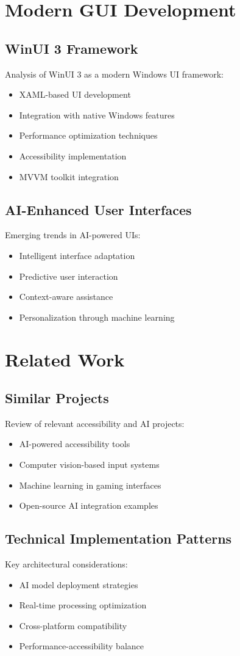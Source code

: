 \section{Modern GUI Development}
\subsection{WinUI 3 Framework}
Analysis of WinUI 3 as a modern Windows UI framework:
\begin{itemize}
    \item XAML-based UI development
    \item Integration with native Windows features
    \item Performance optimization techniques
    \item Accessibility implementation
    \item MVVM toolkit integration
\end{itemize}

\subsection{AI-Enhanced User Interfaces}
Emerging trends in AI-powered UIs:
\begin{itemize}
    \item Intelligent interface adaptation
    \item Predictive user interaction
    \item Context-aware assistance
    \item Personalization through machine learning
\end{itemize}

\section{Related Work}
\subsection{Similar Projects}
Review of relevant accessibility and AI projects:
\begin{itemize}
    \item AI-powered accessibility tools
    \item Computer vision-based input systems
    \item Machine learning in gaming interfaces
    \item Open-source AI integration examples
\end{itemize}

\subsection{Technical Implementation Patterns}
Key architectural considerations:
\begin{itemize}
    \item AI model deployment strategies
    \item Real-time processing optimization
    \item Cross-platform compatibility
    \item Performance-accessibility balance
\end{itemize}
